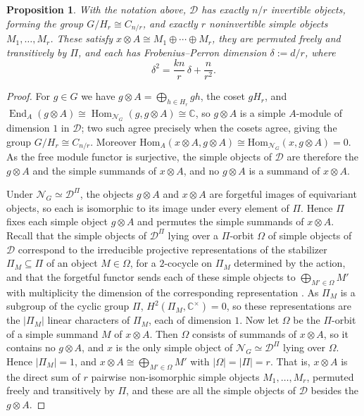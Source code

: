 \documentclass[10pt]{article}
\theoremstyle{plain}
\newtheorem{proposition}[theorem]{Proposition}
\theoremstyle{definition}
\theoremstyle{plain}
\begin{document}
\begin{proposition}\label{prop:deeq}
With the notation above, $\mathcal{D}$ has exactly $n/r$ invertible objects,
forming the group $G/H_r\cong C_{n/r}$, and exactly $r$ noninvertible simple objects $M_1,\dots,M_r$. These satisfy $x\otimes A\cong M_1\oplus\cdots\oplus M_r$, they are permuted freely and transitively by $\Pi$, and each has Frobenius--Perron dimension $\delta:=d/r$, where
\begin{equation}\label{eq:delta}
  \delta^{2}=\frac{kn}{r}\,\delta+\frac{n}{r^{2}} .
\end{equation}
\end{proposition}

\begin{proof}
For $g\in G$ we have $g\otimes A=\bigoplus_{h\in H_r}gh$, the coset $gH_r$, and
$\operatorname{End}_A(g\otimes A)\cong
\operatorname{Hom}_{\mathcal{N}_G}(g,g\otimes A)\cong\mathbb{C}$, so $g\otimes A$
is a simple $A$-module of dimension $1$ in $\mathcal{D}$; two such agree
precisely when the cosets agree, giving the group $G/H_r\cong C_{n/r}$. Moreover $\mathrm{Hom}_A(x\otimes A,g\otimes A)\cong\mathrm{Hom}_{\mathcal{N}_G}(x,g\otimes A)=0$. As the free module functor is surjective, the simple objects of $\mathcal{D}$ are therefore the $g\otimes A$ and the simple summands of $x\otimes A$, and no $g\otimes A$ is a summand of $x\otimes A$.

Under $\mathcal{N}_G\simeq\mathcal{D}^\Pi$, the objects $g\otimes A$ and $x\otimes A$ are forgetful images of equivariant objects, so each is isomorphic to its image under every element of $\Pi$. Hence $\Pi$ fixes each simple object $g\otimes A$ and permutes the simple summands of $x\otimes A$. Recall that the simple objects of $\mathcal{D}^\Pi$ lying over a $\Pi$-orbit $\Omega$ of simple objects of $\mathcal{D}$ correspond to the irreducible projective representations of the stabilizer $\Pi_M\subseteq\Pi$ of an object $M\in\Omega$, for a $2$-cocycle on $\Pi_M$ determined by the action, and that the forgetful functor sends each of these simple objects to $\bigoplus_{M'\in\Omega}M'$ with multiplicity the dimension of the corresponding representation \cite[Corollary 2.13]{MR3059899}. As $\Pi_M$ is a subgroup of the cyclic group $\Pi$, $H^2(\Pi_M,\mathbb{C}^\times)=0$, so these representations are the $|\Pi_M|$ linear characters of $\Pi_M$, each of dimension $1$. Now let $\Omega$ be the $\Pi$-orbit of a simple summand $M$ of $x\otimes A$. Then $\Omega$ consists of summands of $x\otimes A$, so it contains no $g\otimes A$, and $x$ is the only simple object of $\mathcal{N}_G\simeq\mathcal{D}^\Pi$ lying over $\Omega$. Hence $|\Pi_M|=1$, and $x\otimes A\cong\bigoplus_{M'\in\Omega}M'$ with $|\Omega|=|\Pi|=r$. That is, $x\otimes A$ is the direct sum of $r$ pairwise non-isomorphic simple objects $M_1,\dots,M_r$, permuted freely and transitively by $\Pi$, and these are all the simple objects of $\mathcal{D}$ besides the $g\otimes A$.


\end{proof}
\end{document}
